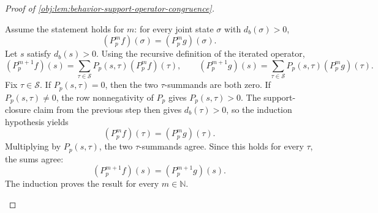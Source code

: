 \begin{proof}[Proof of \cref{obj:lem:behavior-support-operator-congruence}]
\begin{enumerate}
Assume the statement holds for \(m\): for every joint state \(\sigma\) with \(d_b(\sigma)>0\),
\[
(P_p^m f)(\sigma)=(P_p^m g)(\sigma).
\]
Let \(s\) satisfy \(d_b(s)>0\).  Using the recursive definition of the iterated operator,
\[
(P_p^{m+1}f)(s)
=
\sum_{\tau\in\mathcal S}P_p(s,\tau)(P_p^m f)(\tau),
\qquad
(P_p^{m+1}g)(s)
=
\sum_{\tau\in\mathcal S}P_p(s,\tau)(P_p^m g)(\tau).
\]
Fix \(\tau\in\mathcal S\).  If \(P_p(s,\tau)=0\), then the two \(\tau\)-summands are both zero.  If \(P_p(s,\tau)\neq 0\), the row nonnegativity of \(P_p\) gives \(P_p(s,\tau)>0\).  The support-closure claim from the previous step then gives \(d_b(\tau)>0\), so the induction hypothesis yields
\[
(P_p^m f)(\tau)=(P_p^m g)(\tau).
\]
Multiplying by \(P_p(s,\tau)\), the two \(\tau\)-summands agree.  Since this holds for every \(\tau\), the sums agree:
\[
(P_p^{m+1}f)(s)=(P_p^{m+1}g)(s).
\]
The induction proves the result for every \(m\in\mathbb N\). %
\end{enumerate}
\end{proof}
